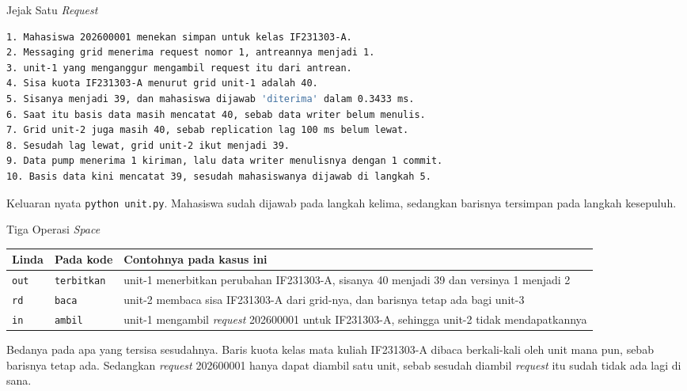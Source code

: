 \documentclass[aspectratio=169, table, 12pt]{beamer}
\begin{document}
\begin{frame}[fragile]{{\Large Jejak Satu \textit{Request}}}
  \vspace{4pt}
\begin{lstlisting}[language=bash, basicstyle=\ttfamily\tiny]
1. Mahasiswa 202600001 menekan simpan untuk kelas IF231303-A.
2. Messaging grid menerima request nomor 1, antreannya menjadi 1.
3. unit-1 yang menganggur mengambil request itu dari antrean.
4. Sisa kuota IF231303-A menurut grid unit-1 adalah 40.
5. Sisanya menjadi 39, dan mahasiswa dijawab 'diterima' dalam 0.3433 ms.
6. Saat itu basis data masih mencatat 40, sebab data writer belum menulis.
7. Grid unit-2 juga masih 40, sebab replication lag 100 ms belum lewat.
8. Sesudah lag lewat, grid unit-2 ikut menjadi 39.
9. Data pump menerima 1 kiriman, lalu data writer menulisnya dengan 1 commit.
10. Basis data kini mencatat 39, sesudah mahasiswanya dijawab di langkah 5.
\end{lstlisting}

  \vspace{4pt}
  {\small Keluaran nyata \texttt{python unit.py}. Mahasiswa sudah dijawab pada
  langkah kelima, sedangkan barisnya tersimpan pada langkah kesepuluh.}
\end{frame}

\begin{frame}{{\Large Tiga Operasi \textit{Space}}}
  \vspace{6pt}
  \centering
  \small
  \begin{tabularx}{0.98\textwidth}{|l|l|X|}
    \hline
    \textbf{Linda} & \textbf{Pada kode} & \textbf{Contohnya pada kasus ini} \\
    \hline
    \texttt{out} & \texttt{terbitkan} & unit-1 menerbitkan perubahan IF231303-A, sisanya 40 menjadi 39 dan versinya 1 menjadi 2 \\
    \hline
    \texttt{rd} & \texttt{baca} & unit-2 membaca sisa IF231303-A dari grid-nya, dan barisnya tetap ada bagi unit-3 \\
    \hline
    \texttt{in} & \texttt{ambil} & unit-1 mengambil \textit{request} 202600001 untuk IF231303-A, sehingga unit-2 tidak mendapatkannya \\
    \hline
  \end{tabularx}

  \vspace{6pt}
  \raggedright
  {\small Bedanya pada apa yang tersisa sesudahnya. Baris kuota kelas mata kuliah IF231303-A
  dibaca berkali-kali oleh unit mana pun, sebab barisnya tetap ada. Sedangkan
  \textit{request} 202600001 hanya dapat diambil satu unit, sebab sesudah
  diambil \textit{request} itu sudah tidak ada lagi di sana.}
\end{frame}
\end{document}
